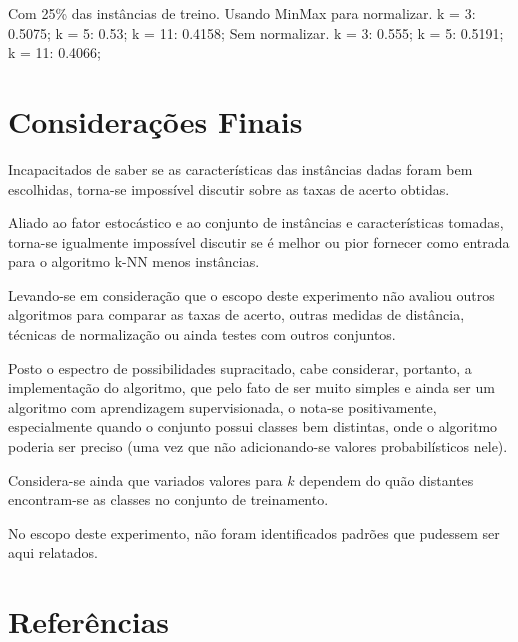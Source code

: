 \documentclass[12pt]{article}
\begin{document}
		Com 25\% das instâncias de treino.
			Usando MinMax para normalizar.
				k = 3: 0.5075;
				k = 5: 0.53;
				k = 11: 0.4158;
			Sem normalizar.
				k = 3: 0.555;
				k = 5: 0.5191;
				k = 11: 0.4066;
				
	\section{Considerações Finais}\label{sec:consideracoesFinais}

		Incapacitados de saber se as características das instâncias dadas foram bem escolhidas, torna-se impossível discutir sobre as taxas de acerto obtidas.
		
		Aliado ao fator estocástico e ao conjunto de instâncias e características tomadas, torna-se igualmente impossível discutir se é melhor ou pior fornecer como entrada para o algoritmo k-NN menos instâncias.

		Levando-se em consideração que o escopo deste experimento não avaliou outros algoritmos para comparar as taxas de acerto, outras medidas de distância, técnicas de normalização ou ainda testes com outros conjuntos.

		Posto o espectro de possibilidades supracitado, cabe considerar, portanto, a implementação do algoritmo, que pelo fato de ser muito simples e ainda ser um algoritmo com aprendizagem supervisionada, o nota-se positivamente, especialmente quando o conjunto possui classes bem distintas, onde o algoritmo poderia ser preciso (uma vez que não adicionando-se valores probabilísticos nele).

		Considera-se ainda que variados valores para $k$ dependem do quão distantes encontram-se as classes no conjunto de treinamento.

		No escopo deste experimento, não foram identificados padrões que pudessem ser aqui relatados.

	\section{Referências}\label{sec:referencias}

		
\end{document}
